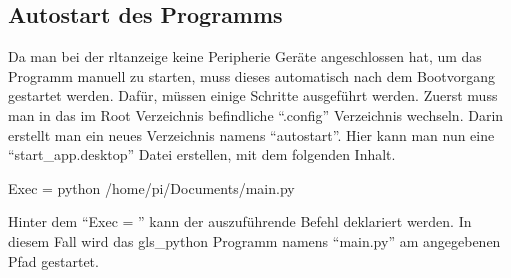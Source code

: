 \subsection{Autostart des Programms} \label{autostart}
Da man bei der \acs{rltanzeige} keine Peripherie Geräte angeschlossen hat, um das Programm manuell zu starten, muss dieses automatisch nach dem Bootvorgang gestartet werden. Dafür, müssen einige Schritte ausgeführt werden. \newline Zuerst muss man in das im Root Verzeichnis befindliche \enquote{.config} Verzeichnis wechseln. Darin erstellt man ein neues Verzeichnis namens \enquote{autostart}. Hier kann man nun eine \enquote{start\_app.desktop} Datei erstellen, mit dem folgenden Inhalt.
\begin{textcode}
Exec = python /home/pi/Documents/main.py
\end{textcode}
Hinter dem \enquote{Exec = } kann der auszuführende Befehl deklariert werden. In diesem Fall wird das \gls{gls_python} Programm namens \enquote{main.py} am angegebenen Pfad gestartet. \cite[vgl.][]{Grace_Xing:2021}